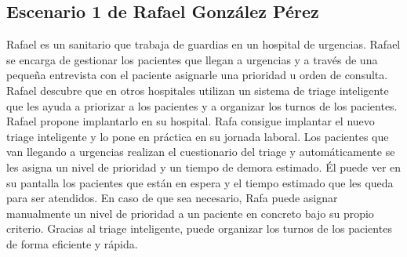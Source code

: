 \subsection{Escenario 1 de Rafael González Pérez}
Rafael es un sanitario que trabaja de guardias en un hospital de urgencias. Rafael se encarga
de gestionar los pacientes que llegan a urgencias y a través de una pequeña entrevista con el paciente asignarle
una prioridad u orden de consulta. Rafael descubre que en otros hospitales utilizan un sistema de triage inteligente
que les ayuda a priorizar a los pacientes y a organizar los turnos de los pacientes. Rafael propone implantarlo en su hospital.
Rafa consigue implantar el nuevo triage inteligente y lo pone en práctica en su jornada laboral. Los pacientes que van llegando
a urgencias realizan el cuestionario del triage y automáticamente se les asigna un nivel de prioridad y un tiempo de demora estimado.
Él puede ver en su pantalla los pacientes que están en espera y el tiempo estimado que les queda para ser atendidos. En caso
de que sea necesario, Rafa puede asignar manualmente un nivel de prioridad a un paciente en concreto bajo su propio criterio.
Gracias al triage inteligente, puede organizar los turnos de los pacientes de forma eficiente y rápida.


